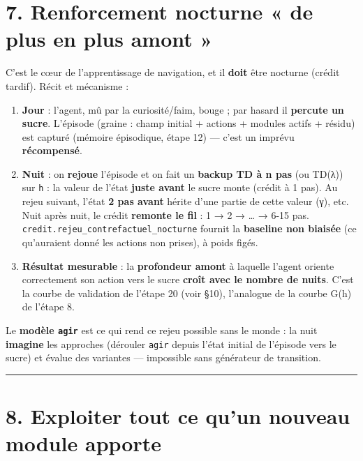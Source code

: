 \documentclass[
  french,
  11pt,
]{article}
\providecommand{\tightlist}{%
  \setlength{\itemsep}{0pt}\setlength{\parskip}{0pt}}
\begin{document}
\section{7. Renforcement nocturne « de plus en plus amont
»}\label{renforcement-nocturne-de-plus-en-plus-amont}

C'est le cœur de l'apprentissage de navigation, et il \textbf{doit} être
nocturne (crédit tardif). Récit et mécanisme :

\begin{enumerate}
\def\labelenumi{\arabic{enumi}.}
\tightlist
\item
  \textbf{Jour} : l'agent, mû par la curiosité/faim, bouge ; par hasard
  il \textbf{percute un sucre}. L'épisode (graine : champ initial +
  actions + modules actifs + résidu) est capturé (mémoire épisodique,
  étape 12) --- c'est un imprévu \textbf{récompensé}.
\item
  \textbf{Nuit} : on \textbf{rejoue} l'épisode et on fait un
  \textbf{backup TD à n pas} (ou TD(λ)) sur \texttt{h} : la valeur de
  l'état \textbf{juste avant} le sucre monte (crédit à 1 pas). Au rejeu
  suivant, l'état \textbf{2 pas avant} hérite d'une partie de cette
  valeur (γ), etc. Nuit après nuit, le crédit \textbf{remonte le fil} :
  1 → 2 → \ldots{} → 6-15 pas.
  \texttt{credit.rejeu\_contrefactuel\_nocturne} fournit la
  \textbf{baseline non biaisée} (ce qu'auraient donné les actions non
  prises), à poids figés.
\item
  \textbf{Résultat mesurable} : la \textbf{profondeur amont} à laquelle
  l'agent oriente correctement son action vers le sucre \textbf{croît
  avec le nombre de nuits}. C'est la courbe de validation de l'étape 20
  (voir §10), l'analogue de la courbe G(h) de l'étape 8.
\end{enumerate}

Le \textbf{modèle \texttt{agir}} est ce qui rend ce rejeu possible sans
le monde : la nuit \textbf{imagine} les approches (dérouler
\texttt{agir} depuis l'état initial de l'épisode vers le sucre) et
évalue des variantes --- impossible sans générateur de transition.

\begin{center}\rule{0.5\linewidth}{0.5pt}\end{center}

\section{8. Exploiter tout ce qu'un nouveau module
apporte}\label{exploiter-tout-ce-quun-nouveau-module-apporte}
\end{document}
